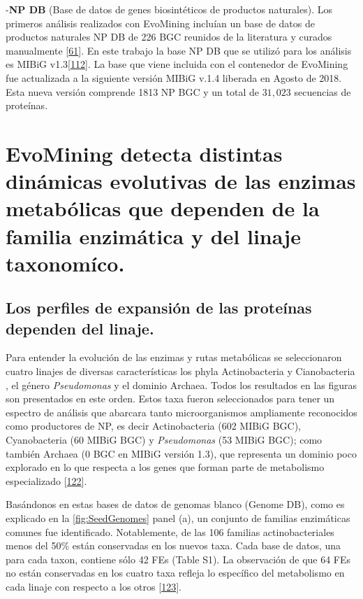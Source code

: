 \documentclass[12pt,twoside]{reedthesis}
\begin{document}
  -\textbf{NP DB} (Base de datos de genes biosintéticos de productos
  naturales). Los primeros análisis realizados con EvoMining incluían un
  base de datos de productos naturales NP DB de 226 BGC reunidos de la
  literatura y curados manualmente
  {[}\protect\hyperlink{ref-cruz-morales_phylogenomic_2016}{61}{]}. En
  este trabajo la base NP DB que se utilizó para los análisis es MIBiG
  v1.3{[}\protect\hyperlink{ref-medema_minimum_2015}{112}{]}. La base que
  viene incluida con el contenedor de EvoMining fue actualizada a la
  siguiente versión MIBiG v.1.4 liberada en Agosto de 2018. Esta nueva
  versión comprende 1813 NP BGC y un total de \(31,023\) secuencias de
  proteínas.
  
  \section{EvoMining detecta distintas dinámicas evolutivas de las enzimas
  metabólicas que dependen de la familia enzimática y del linaje
  taxonomíco.}\label{evomining-detecta-distintas-dinamicas-evolutivas-de-las-enzimas-metabolicas-que-dependen-de-la-familia-enzimatica-y-del-linaje-taxonomico.}
  
  \subsection{Los perfiles de expansión de las proteínas dependen del
  linaje.}\label{los-perfiles-de-expansion-de-las-proteinas-dependen-del-linaje.}
  
  Para entender la evolución de las enzimas y rutas metabólicas se
  seleccionaron cuatro linajes de diversas características los phyla
  Actinobacteria y Cianobacteria , el género \emph{Pseudomonas} y el
  dominio Archaea. Todos los resultados en las figuras son presentados en
  este orden. Estos taxa fueron seleccionados para tener un espectro de
  análisis que abarcara tanto microorganismos ampliamente reconocidos como
  productores de NP, es decir Actinobacteria (602 MIBiG BGC),
  Cyanobacteria (60 MIBiG BGC) y \emph{Pseudomonas} (53 MIBiG BGC); como
  también Archaea (0 BGC en MIBiG versión 1.3), que representa un dominio
  poco explorado en lo que respecta a los genes que forman parte de
  metabolismo especializado
  {[}\protect\hyperlink{ref-charlesworth_untapped_2015}{122}{]}.
  
  Basándonos en estas bases de datos de genomas blanco (Genome DB), como
  es explicado en la \autoref{fig:SeedGenomes} panel (a), un conjunto de
  familias enzimáticas comunes fue identificado. Notablemente, de las 106
  familias actinobacteriales menos del 50\% están conservadas en los
  nuevos taxa. Cada base de datos, una para cada taxon, contiene sólo 42
  FEs (Table S1). La observación de que 64 FEs no están conservadas en los
  cuatro taxa refleja lo específico del metabolismo en cada linaje con
  respecto a los otros
  {[}\protect\hyperlink{ref-jordan_lineage-specific_2001}{123}{]}.
  
\end{document}
